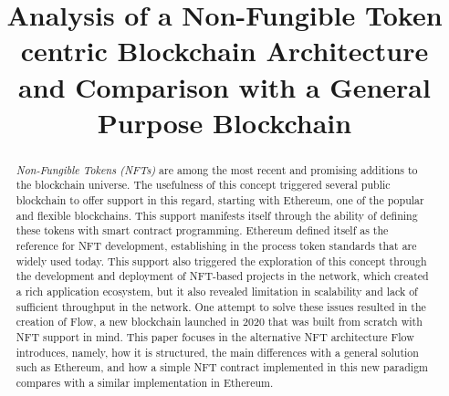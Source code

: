 \documentclass[conference]{IEEEtran}
\begin{document}
\title{Analysis of a Non-Fungible Token centric Blockchain Architecture and Comparison with a General Purpose Blockchain}

\author{
    \and
    \and
    \and
}

\maketitle

\begin{abstract}
    \textit{Non-Fungible Tokens (NFTs)} are among the most recent and promising additions to the blockchain universe. The usefulness of this concept triggered several public blockchain to offer support in this regard, starting with Ethereum, one of the popular and flexible blockchains. This support manifests itself through the ability of defining these tokens with smart contract programming. Ethereum defined itself as the reference for NFT development, establishing in the process token standards that are widely used today. This support also triggered the exploration of this concept through the development and deployment of NFT-based projects in the network, which created a rich application ecosystem, but it also revealed limitation in scalability and lack of sufficient throughput in the network. One attempt to solve these issues resulted in the creation of Flow, a new blockchain launched in 2020 that was built from scratch with NFT support in mind. This paper focuses in the alternative NFT architecture Flow introduces, namely, how it is structured, the main differences with a general solution such as Ethereum, and how a simple NFT contract implemented in this new paradigm compares with a similar implementation in Ethereum.
\end{abstract}
\end{document}
